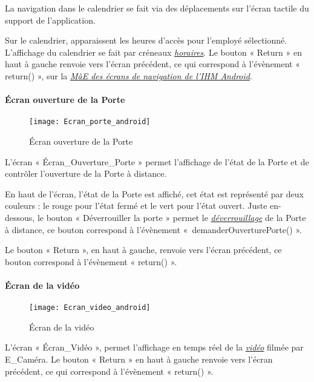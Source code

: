 La navigation dans le calendrier se fait via des déplacements sur l’écran tactile du support de l’application.

Sur le calendrier, apparaissent les heures d’accès pour l’employé sélectionné. 
L’affichage du calendrier se fait par créneaux \hyperlink{hor}{\textit{horaires}}.
Le bouton « Return » en haut à gauche renvoie vers l’écran précédent, ce qui correspond à l'évènement « return() », sur la \hyperlink{MaEHome}{\textit{MàE des écrans de navigation de l’IHM Android}}. 

\paragraph{Écran ouverture de la Porte}
\hypertarget{EcranPorte}{}

\begin{figure} [H]
    \centering
    \texttt{[image: Ecran\_porte\_android]}
    \caption{Écran ouverture de la Porte}
    \label{Écran ouverture de la porte}
\end{figure}


L’écran « Écran\_Ouverture\_Porte » permet l’affichage de l'état de la Porte et de contrôler l'ouverture de la Porte à distance.

En haut de l’écran, l’état de la Porte est affiché, cet état est représenté par deux couleurs : le rouge pour l’état fermé et le vert pour l’état ouvert.
Juste en-dessous, le bouton « Déverrouiller la porte » permet le \hyperlink{deverrouiller}{\textit{déverrouillage}} de la Porte à distance, ce bouton correspond à l'évènement «~demanderOuverturePorte() ».

Le bouton « Return », en haut à gauche, renvoie vers l’écran précédent, ce bouton correspond à l'évènement « return() ».

\paragraph{Écran de la vidéo}
\hypertarget{EcranVideo}{}

\begin{figure} [H]
    \centering
    \texttt{[image: Ecran\_video\_android]}
    \caption{Écran de la vidéo}
    \label{Écran de la vidéo}
\end{figure}

L’écran « Écran\_Vidéo », permet l’affichage en temps réel de la \hyperlink{video}{\textit{vidéo}} filmée par E\_Caméra. 
Le bouton « Return » en haut à gauche renvoie vers l’écran précédent, ce qui correspond à l'évènement « return() ». 

